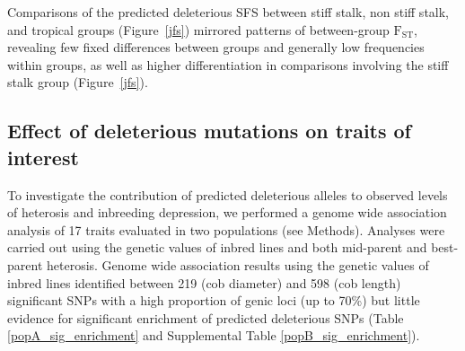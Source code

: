 \documentclass[12pt]{article}
\begin{document}
Comparisons of the predicted deleterious SFS between stiff stalk, non stiff stalk, and tropical groups (Figure~\ref{jfs}) mirrored patterns of between-group  $\mathrm{F}_{\mathrm{ST}}$, revealing few fixed differences between groups and generally low frequencies within groups, as well as higher differentiation in comparisons involving the stiff stalk group (Figure~\ref{jfs}).

\subsection*{Effect of deleterious mutations on traits of interest}

To investigate the contribution of predicted deleterious alleles to observed levels of heterosis and inbreeding depression, we performed a genome wide association analysis of 17 traits evaluated in two populations (see Methods). Analyses were carried out using the genetic values of inbred lines and both mid-parent and best-parent heterosis. Genome wide association results using the genetic values of inbred lines identified between 219 (cob diameter) and 598 (cob length) significant SNPs with a high proportion of genic loci (up to 70\%) but little evidence for significant enrichment of predicted deleterious SNPs (Table \ref{popA_sig_enrichment} and Supplemental Table \ref{popB_sig_enrichment}). 
\end{document}
